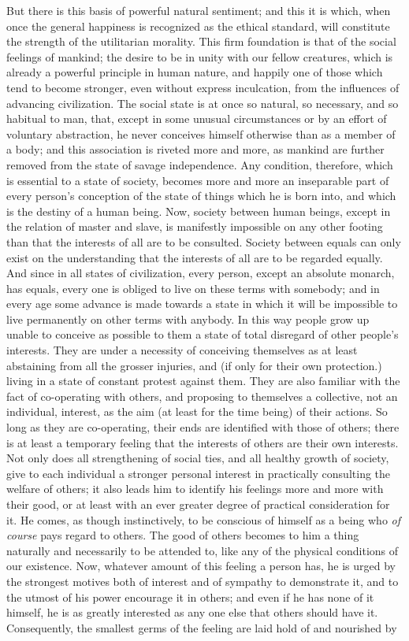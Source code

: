 \documentclass[12pt]{report}
\begin{document}
But there is this basis of powerful natural sentiment; and this it is which, when once the general happiness is recognized as the ethical standard, will constitute the strength of the utilitarian morality. This firm foundation is that of the social feelings of mankind; the desire to be in unity with our fellow creatures, which is already a powerful principle in human nature, and happily one of those which tend to become stronger, even without express inculcation, from the influences of advancing civilization. The social state is at once so natural, so necessary, and so habitual to man, that, except in some unusual circumstances or by an effort of voluntary abstraction, he never conceives himself otherwise than as a member of a body; and this association is riveted more and more, as mankind are further removed from the state of savage independence. Any condition, therefore, which is essential to a state of society, becomes more and more an inseparable part of every person's conception of the state of things which he is born into, and which is the destiny of a human being. Now, society between human beings, except in the relation of master and slave, is manifestly impossible on any other footing than that the interests of all are to be consulted. Society between equals can only exist on the understanding that the interests of all are to be regarded equally. And since in all states of civilization, every person, except an absolute monarch, has equals, every one is obliged to live on these terms with somebody; and in every age some advance is made towards a state in which it will be impossible to live permanently on other terms with anybody. In this way people grow up unable to conceive as possible to them a state of total disregard of other people's interests. They are under a necessity of conceiving themselves as at least abstaining from all the grosser injuries, and (if only for their own protection.) living in a state of constant protest against them. They are also familiar with the fact of co-operating with others, and proposing to themselves a collective, not an individual, interest, as the aim (at least for the time being) of their actions. So long as they are co-operating, their ends are identified with those of others; there is at least a temporary feeling that the interests of others are their own interests. Not only does all strengthening of social ties, and all healthy growth of society, give to each individual a stronger personal interest in practically consulting the welfare of others; it also leads him to identify his feelings more and more with their good, or at least with an ever greater degree of practical consideration for it. He comes, as though instinctively, to be conscious of himself as a being who \emph{of course} pays regard to others. The good of others becomes to him a thing naturally and necessarily to be attended to, like any of the physical conditions of our existence. Now, whatever amount of this feeling a person has, he is urged by the strongest motives both of interest and of sympathy to demonstrate it, and to the utmost of his power encourage it in others; and even if he has none of it himself, he is as greatly interested as any one else that others should have it. Consequently, the smallest germs of the feeling are laid hold of and nourished by 
\end{document}
